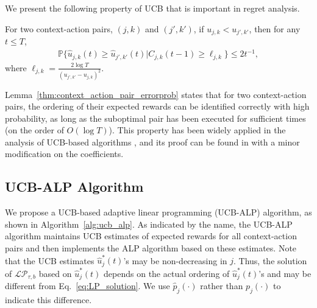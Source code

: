 We present the following property of UCB that is important in regret analysis.
\begin{lemma} \label{thm:context_action_pair_errorprob}
For two context-action pairs, $(j, k)$ and $(j', k')$, if $u_{j,k} < u_{j',k'}$, then for any $t \leq T$,
\begin{eqnarray}
\mathbb{P}\{\hat{u}_{j,k}(t) \geq \hat{u}_{j',k'}(t)|C_{j,k}(t-1) \geq \ell_{j,k}\} \leq 2t^{-1},
\end{eqnarray}
where $\ell_{j,k} =  \frac{2\log T}{(u_{j',k'} - u_{j,k})^2}$.
\end{lemma}

Lemma~\ref{thm:context_action_pair_errorprob} states that for two context-action pairs, the ordering of their expected rewards can be identified correctly with high probability, as long as the suboptimal pair has been executed for sufficient times (on the order of $O(\log T)$). This property has been widely applied in the analysis of UCB-based algorithms \cite{Auer2002ML:UCB,Jiang2013CDC}, and its proof can be found in \cite{Jiang2013CDC,Golovin2009Lecture} with a minor modification on the coefficients.


%
%



\subsection{UCB-ALP Algorithm}
We propose a UCB-based adaptive linear programming (UCB-ALP) algorithm, as shown in Algorithm~\ref{alg:ucb_alp}.
As indicated by the name, the UCB-ALP algorithm maintains UCB estimates of expected rewards for all context-action pairs
and then implements the ALP algorithm based on these estimates. Note that the UCB estimates  $\hat{u}_j^*(t)$'s may be non-decreasing in $j$. Thus, the solution of $\mathcal{LP}_{\tau,b}$ based on $\hat{u}_j^*(t)$ depends on the actual ordering of $\hat{u}_j^*(t)$'s and may be different from Eq.~\eqref{eq:LP_solution}. We use $\hat{p}_{j}(\cdot)$ rather than $p_j(\cdot)$ to indicate this difference.

